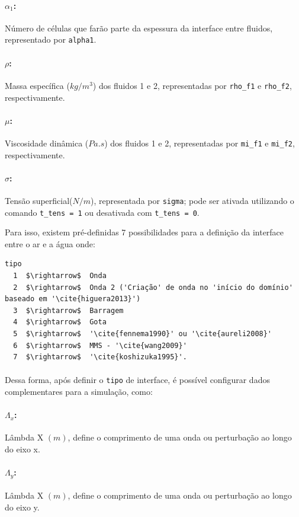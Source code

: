 \documentclass[12pt, a4paper]{article}
\begin{document}
\paragraph{$\alpha_1$:} Número de células que farão parte da espessura da interface entre fluidos, representado por \verb|alpha1|.
\paragraph{$\rho$:} Massa específica ($kg/m^3$) dos fluidos 1 e 2, representadas por \verb|rho_f1| e \verb|rho_f2|, respectivamente.
\paragraph{$\mu$:} Viscosidade dinâmica ($Pa.s$) dos fluidos 1 e 2, representadas por \verb|mi_f1| e \verb|mi_f2|, respectivamente.
\paragraph{$\sigma$:} Tensão superficial($N/m$), representada por \verb|sigma|; pode ser ativada utilizando o comando \verb|t_tens = 1| ou desativada com \verb|t_tens = 0|.
\vspace{0.5cm}

Para isso, existem pré-definidas 7 possibilidades para a definição da interface entre o ar e a água onde:

\vspace{0.5cm}
\begin{lstlisting}[escapeinside='']
tipo
  1  $\rightarrow$  Onda 
  2  $\rightarrow$  Onda 2 ('Criação' de onda no 'início do domínio' baseado em '\cite{higuera2013}')
  3  $\rightarrow$  Barragem 
  4  $\rightarrow$  Gota 
  5  $\rightarrow$  '\cite{fennema1990}' ou '\cite{aureli2008}'
  6  $\rightarrow$  MMS - '\cite{wang2009}'
  7  $\rightarrow$  '\cite{koshizuka1995}'.
\end{lstlisting}

\paragraph{} Dessa forma, após definir o \verb|tipo| de interface, é possível configurar dados complementares para a simulação, como:
\paragraph{$\Lambda_x$:} Lâmbda X $(m)$, define o comprimento de uma onda ou perturbação ao longo do eixo x.
\paragraph{$\Lambda_y$:} Lâmbda X $(m)$, define o comprimento de uma onda ou perturbação ao longo do eixo y.
\end{document}
